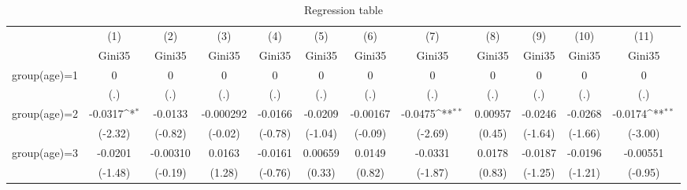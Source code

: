 \begin{table}[htbp]\centering
\def\sym#1{\ifmmode^{#1}\else\(^{#1}\)\fi}
\caption{Regression table\label{reg2}}
\begin{tabular}{l*{11}{c}}
\hline\hline
                    &\multicolumn{1}{c}{(1)}&\multicolumn{1}{c}{(2)}&\multicolumn{1}{c}{(3)}&\multicolumn{1}{c}{(4)}&\multicolumn{1}{c}{(5)}&\multicolumn{1}{c}{(6)}&\multicolumn{1}{c}{(7)}&\multicolumn{1}{c}{(8)}&\multicolumn{1}{c}{(9)}&\multicolumn{1}{c}{(10)}&\multicolumn{1}{c}{(11)}\\
                    &\multicolumn{1}{c}{Gini35}&\multicolumn{1}{c}{Gini35}&\multicolumn{1}{c}{Gini35}&\multicolumn{1}{c}{Gini35}&\multicolumn{1}{c}{Gini35}&\multicolumn{1}{c}{Gini35}&\multicolumn{1}{c}{Gini35}&\multicolumn{1}{c}{Gini35}&\multicolumn{1}{c}{Gini35}&\multicolumn{1}{c}{Gini35}&\multicolumn{1}{c}{Gini35}\\
\hline
group(age)=1        &           0         &           0         &           0         &           0         &           0         &           0         &           0         &           0         &           0         &           0         &           0         \\
                    &         (.)         &         (.)         &         (.)         &         (.)         &         (.)         &         (.)         &         (.)         &         (.)         &         (.)         &         (.)         &         (.)         \\
[1em]
group(age)=2        &     -0.0317\sym{*}  &     -0.0133         &   -0.000292         &     -0.0166         &     -0.0209         &    -0.00167         &     -0.0475\sym{**} &     0.00957         &     -0.0246         &     -0.0268         &     -0.0174\sym{**} \\
                    &     (-2.32)         &     (-0.82)         &     (-0.02)         &     (-0.78)         &     (-1.04)         &     (-0.09)         &     (-2.69)         &      (0.45)         &     (-1.64)         &     (-1.66)         &     (-3.00)         \\
[1em]
group(age)=3        &     -0.0201         &    -0.00310         &      0.0163         &     -0.0161         &     0.00659         &      0.0149         &     -0.0331         &      0.0178         &     -0.0187         &     -0.0196         &    -0.00551         \\
                    &     (-1.48)         &     (-0.19)         &      (1.28)         &     (-0.76)         &      (0.33)         &      (0.82)         &     (-1.87)         &      (0.83)         &     (-1.25)         &     (-1.21)         &     (-0.95)         \\

\end{tabular}
\end{table}
